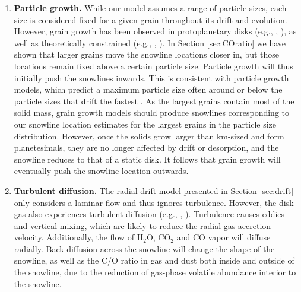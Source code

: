 \documentclass[apj]{emulateapj}
\begin{document}
\begin{enumerate}
\item \textbf{Particle growth.} While our model assumes a range of particle sizes, each size is considered fixed for a given grain throughout its drift and evolution. However, grain growth has been observed in protoplanetary disks (e.g., \citealt{ricci10}, \citealt{perez12}), as well as theoretically constrained (e.g., \citealt{birnstiel10}, \citealt{birnstiel12}). In Section \ref{sec:COratio} we have shown that larger grains move the snowline locations closer in, but those locations remain fixed above a certain particle size. Particle growth will thus initially push the snowlines inwards. This is consistent with particle growth models, which predict a maximum particle size often around or below the particle sizes that drift the fastest \citep{birnstiel12}. As the largest grains contain most of the solid mass, grain growth models should produce snowlines corresponding to our snowline location estimates for the largest grains in the particle size distribution. However, once the solids grow larger than km-sized and form planetesimals, they are no longer affected by drift or desorption, and the snowline reduces to that of a static disk. It follows that grain growth will eventually push the snowline location outwards.

\item \textbf{Turbulent diffusion.} The radial drift model presented in Section \ref{sec:drift} only considers a laminar flow and thus ignores turbulence. However, the disk gas also experiences turbulent diffusion (e.g., \citealt{birnstiel12}, \citealt{alidib14}). Turbulence causes eddies and vertical mixing, which are likely to reduce the radial gas accretion velocity. Additionally, the flow of H$_2$O, CO$_2$ and CO vapor will diffuse radially. Back-diffusion across the snowline will change the shape of the snowline, as well as the C/O ratio in gas and dust both inside and outside of the snowline, due to the reduction of gas-phase volatile abundance interior to the snowline. 


\end{enumerate}
\end{document}
